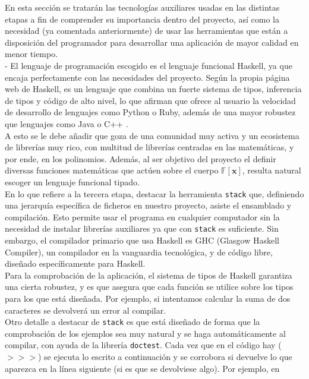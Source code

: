 En esta sección se tratarán las tecnologías auxiliares usadas en las distintas etapas a fin de comprender su importancia dentro del proyecto, así como la necesidad (ya comentada anteriormente) de usar las herramientas que están a disposición del programador para desarrollar una aplicación de mayor calidad en menor tiempo.\\
-
El lenguaje de programación escogido es el lenguaje funcional Haskell, ya que encaja perfectamente con las necesidades del proyecto. Según la propia página web de Haskell, es un lenguaje que combina un fuerte sistema de tipos, inferencia de tipos y código de alto nivel, lo que afirman que ofrece al usuario la velocidad de desarrollo de lenguajes como Python o Ruby, además de una mayor robustez que lenguajes como Java o C++ .\\

A esto se le debe añadir que goza de una comunidad muy activa y un ecosistema de librerías muy rico, con multitud de librerías centradas en las matemáticas, y por ende, en los polinomios. Además, al ser objetivo del proyecto el definir diversas funciones matemáticas que actúen sobre el cuerpo $\mathbb{F} [\textbf{x}]$, resulta natural escoger un lenguaje funcional tipado.\\

En lo que refiere a la tercera etapa, destacar la herramienta \texttt{stack} que, definiendo una jerarquía específica de ficheros en nuestro proyecto, asiste el ensamblado y compilación. Esto permite usar el programa en cualquier computador sin la necesidad de instalar librerías auxiliares ya que con \texttt{stack} es suficiente. Sin embargo, el compilador primario que usa Haskell es GHC (Glasgow Haskell Compiler), un compilador en la vanguardia tecnológica, y de código libre, diseñado específicamente para Haskell.\\

Para la comprobación de la aplicación, el sistema de tipos de Haskell garantiza una cierta robustez, y es que asegura que cada función se utilice sobre los tipos para los que está diseñada. Por ejemplo, si intentamos calcular la suma de dos caracteres se devolverá un error al compilar.\\

Otro detalle a destacar de \texttt{stack} es que está diseñado de forma que la comprobación de los ejemplos sea muy natural y se haga automáticamente al compilar, con ayuda de la librería \texttt{doctest}. Cada vez que en el código hay ($>>>$) se ejecuta lo escrito a continuación y se corrobora si devuelve lo que aparezca en la línea siguiente (si es que se devolviese algo). Por ejemplo, en

